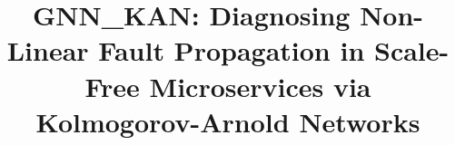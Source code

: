 \documentclass[conference]{IEEEtran}
\begin{document}
\title{GNN\_KAN: Diagnosing Non-Linear Fault Propagation in Scale-Free Microservices via Kolmogorov-Arnold Networks}


\maketitle
\end{document}
